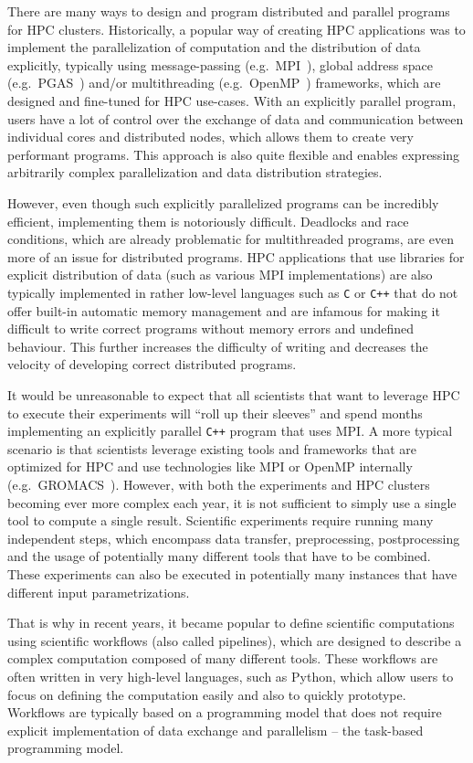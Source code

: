 There are many ways to design and program distributed and parallel programs for HPC clusters.
Historically, a popular way of creating HPC applications was to implement the parallelization of
computation and the distribution of data explicitly, typically using message-passing (e.g.\
MPI~\cite{mpi}), global address space (e.g.\ PGAS~\cite{pgas}) and/or
multithreading (e.g.\ OpenMP~\cite{openmp}) frameworks, which are designed and fine-tuned
for HPC use-cases. With an explicitly parallel program, users have a lot of control over the
exchange of data and communication between individual cores and distributed nodes, which allows
them to create very performant programs. This approach is also quite flexible and enables
expressing arbitrarily complex parallelization and data distribution strategies.

However, even though such explicitly parallelized programs can be incredibly efficient,
implementing them is notoriously difficult. Deadlocks and race conditions, which are already
problematic for multithreaded programs, are even more of an issue for distributed programs. HPC
applications that use libraries for explicit distribution of data (such as various MPI
implementations) are also typically implemented in rather low-level languages such as
\texttt{C} or \texttt{C++} that do not offer built-in automatic memory
management and are infamous for making it difficult to write correct programs without memory errors
and undefined behaviour. This further increases the difficulty of writing and decreases the
velocity of developing correct distributed programs.

It would be unreasonable to expect that all scientists that want to leverage HPC to execute their
experiments will ``roll up their sleeves'' and spend months implementing an explicitly parallel
\texttt{C++} program that uses MPI. A more typical scenario is that scientists leverage
existing tools and frameworks that are optimized for HPC and use technologies like MPI or OpenMP
internally (e.g.\ GROMACS~\cite{gromacs}). However, with both the experiments and HPC
clusters becoming ever more complex each year, it is not sufficient to simply use a single tool to
compute a single result. Scientific experiments require running many independent steps, which
encompass data transfer, preprocessing, postprocessing and the usage of potentially many different
tools that have to be combined. These experiments can also be executed in potentially many
instances that have different input parametrizations.

That is why in recent years, it became popular to define scientific computations using scientific
workflows (also called pipelines), which are designed to describe a complex computation composed of
many different tools. These workflows are often written in very high-level languages, such as
Python, which allow users to focus on defining the computation easily and also to quickly
prototype. Workflows are typically based on a programming model that does not require explicit
implementation of data exchange and parallelism -- the task-based programming model.

